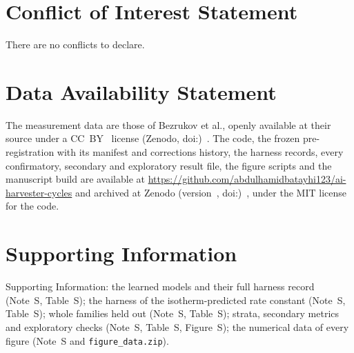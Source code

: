 \documentclass[12pt]{article}
\begin{document}
\section*{Conflict of Interest Statement}

There are no conflicts to declare.

\section*{Data Availability Statement}

The measurement data are those of Bezrukov et al., openly available at their source under a CC~BY~ license
(Zenodo, doi:)~\cite{Bezrukov2023Data}. The code, the frozen pre-registration with its
manifest and corrections history, the harness records, every confirmatory, secondary and exploratory result file, the
figure scripts and the manuscript build are available at \url{https://github.com/abdulhamidbatayhi123/ai-harvester-cycles}
and archived at Zenodo (version~, doi:)~\cite{Batayhi2026Archive}, under the MIT
license for the
code.

\section*{Supporting Information}

Supporting Information: the learned models and their full harness record (Note~S, Table~S); the harness
of the isotherm-predicted rate constant (Note~S, Table~S); whole families held out (Note~S,
Table~S); strata, secondary metrics and exploratory checks (Note~S, Table~S, Figure~S); the
numerical data of every figure (Note~S and \texttt{figure\_data.zip}).


\end{document}
